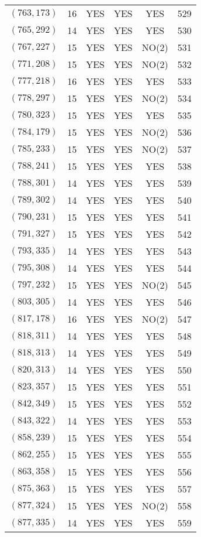 \begin{longtable}{|c|c|c|c|c|c|}
$(763, 173)$ & 16 & YES & YES & YES & 529\\
$(765, 292)$ & 14 & YES & YES & YES & 530\\
$(767, 227)$ & 15 & YES & YES & NO(2) & 531\\
$(771, 208)$ & 15 & YES & YES & NO(2) & 532\\
$(777, 218)$ & 16 & YES & YES & YES & 533\\
$(778, 297)$ & 15 & YES & YES & NO(2) & 534\\
$(780, 323)$ & 15 & YES & YES & YES & 535\\
$(784, 179)$ & 15 & YES & YES & NO(2) & 536\\
$(785, 233)$ & 15 & YES & YES & NO(2) & 537\\
$(788, 241)$ & 15 & YES & YES & YES & 538\\
$(788, 301)$ & 14 & YES & YES & YES & 539\\
$(789, 302)$ & 14 & YES & YES & YES & 540\\
$(790, 231)$ & 15 & YES & YES & YES & 541\\
$(791, 327)$ & 15 & YES & YES & YES & 542\\
$(793, 335)$ & 14 & YES & YES & YES & 543\\
$(795, 308)$ & 14 & YES & YES & YES & 544\\
$(797, 232)$ & 15 & YES & YES & NO(2) & 545\\
$(803, 305)$ & 14 & YES & YES & YES & 546\\
$(817, 178)$ & 16 & YES & YES & NO(2) & 547\\
$(818, 311)$ & 14 & YES & YES & YES & 548\\
$(818, 313)$ & 14 & YES & YES & YES & 549\\
$(820, 313)$ & 14 & YES & YES & YES & 550\\
$(823, 357)$ & 15 & YES & YES & YES & 551\\
$(842, 349)$ & 15 & YES & YES & YES & 552\\
$(843, 322)$ & 14 & YES & YES & YES & 553\\
$(858, 239)$ & 15 & YES & YES & YES & 554\\
$(862, 255)$ & 15 & YES & YES & YES & 555\\
$(863, 358)$ & 15 & YES & YES & YES & 556\\
$(875, 363)$ & 15 & YES & YES & YES & 557\\
$(877, 324)$ & 15 & YES & YES & NO(2) & 558\\
$(877, 335)$ & 14 & YES & YES & YES & 559\\

\end{longtable}
